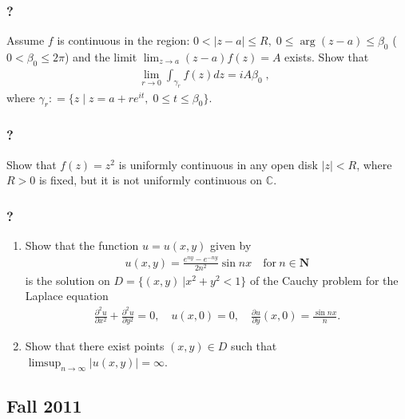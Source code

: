 \hypertarget{section-104}{%
\subsubsection{?}\label{section-104}}

Assume \(f\) is continuous in the region:
\(0< |z-a| \leq R, \; 0 \leq \arg(z-a) \leq \beta_0\)
(\(0 < \beta_0 \leq 2 \pi\)) and the limit
\(\displaystyle \lim_{z \rightarrow a} (z-a) f(z) = A\) exists. Show
that
\begin{align*}\lim_{r \rightarrow 0} \int_{\gamma_r} f(z) dz  = i A \beta_0 \; , \; \;\end{align*}
where
\(\gamma_r : = \{ z \; | \; z = a + r e^{it}, \; 0 \leq t \leq \beta_0 \}.\)

\hypertarget{section-105}{%
\subsubsection{?}\label{section-105}}

Show that \(f(z) = z^2\) is uniformly continuous in any open disk
\(|z| < R\), where \(R>0\) is fixed, but it is not uniformly continuous
on \(\mathbb C\).

\hypertarget{section-106}{%
\subsubsection{?}\label{section-106}}

\begin{enumerate}
\def\labelenumi{(\arabic{enumi})}
\tightlist
\item
  Show that the function \(u=u(x,y)\) given by
  \begin{align*}u(x,y)=\frac{e^{ny}-e^{-ny}}{2n^2}\sin nx\quad \text{for}\ n\in {\mathbf N}\end{align*}
  is the solution on \(D=\{(x,y)\ | x^2+y^2<1\}\) of the Cauchy problem
  for the Laplace equation
  \begin{align*}\frac{\partial ^2u}{\partial x^2}+\frac{\partial ^2u}{\partial y^2}=0,\quad
  u(x,0)=0,\quad \frac{\partial u}{\partial y}(x,0)=\frac{\sin nx}{n}.\end{align*}
\item
  Show that there exist points \((x,y)\in D\) such that
  \(\displaystyle{\limsup_{n\to\infty} |u(x,y)|=\infty}\).
\end{enumerate}

\hypertarget{fall-2011}{%
\subsection{Fall 2011}\label{fall-2011}}

